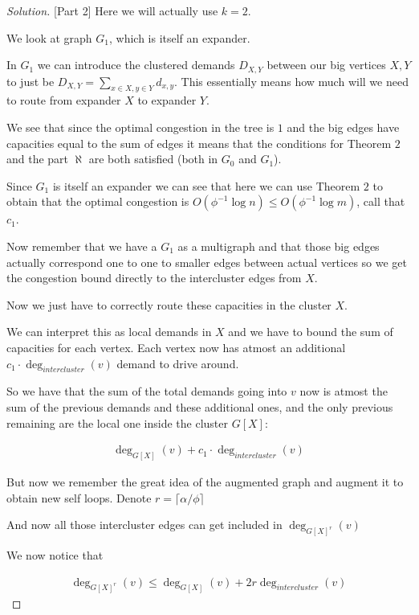 \documentclass[a4paper,11pt]{article}
\DeclareMathOperator{\degG}{deg}
\newenvironment{solution}
  {\begin{proof}[Solution]}
  {\end{proof}}
\begin{document}
\begin{solution}[Part 2]
    Here we will actually use $k=2$.

    We look at graph $G_1$, which is itself an expander. 

    In $G_1$ we can introduce the clustered demands $D_{X,Y}$ between our big vertices $X, Y$ to just be $D_{X,Y} = \sum _{x \in X, y \in Y} d_{x,y}$. This essentially means how much will we need to route from expander $X$ to expander $Y$.

    We see that since the optimal congestion in the tree is $1$ and the big edges have capacities equal to the sum of edges it means that the conditions for Theorem $2$ and the part $\aleph$ are both satisfied (both in $G_0$ and $G_1$).

    Since $G_1$ is itself an expander we can see that here we can use Theorem $2$ to obtain that the optimal congestion is $O(\phi^{-1} \log n) \leq  O(\phi ^{-1}\log m)$, call that $c_1$.

    Now remember that we have a $G_1$ as a multigraph and that those big edges actually correspond one to one to smaller edges between actual vertices so we get the congestion bound directly to the intercluster edges from $X$.

    Now we just have to correctly route these capacities in the cluster $X$.

    We can interpret this as local demands in $X$ and we have to bound the sum of capacities for each vertex. Each vertex now has atmost an additional $c_1 \cdot \degG _{intercluster} (v)$ demand to drive around.

    So we have that the sum of the total demands going into $v$ now is atmost the sum of the previous demands and these additional ones, and the only previous remaining are the local one inside the cluster $G[X]$:

    \begin{align}
        \degG_{G[X]} (v) + c_1 \cdot \degG _{intercluster} (v)
    \end{align}

    But now we remember the great idea of the augmented graph and augment it to obtain new self loops. Denote $r = \lceil \alpha / \phi \rceil$

    And now all those intercluster edges can get included in $\degG_{G[X]^r} (v)$

    We now notice that

    \begin{align}
        \degG_{G[X]^r} (v) \leq \degG_{G[X]} (v) + 2r  \degG _{intercluster} (v)
    \end{align}


\end{solution}
\end{document}
